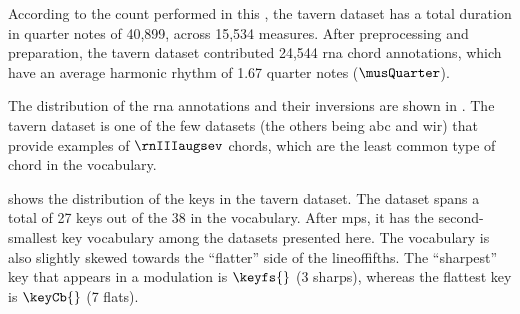 
According to the count performed in this \thesisdiss{}, the
\gls{tavern} dataset has a total duration in quarter notes
of 40,899, across 15,534 measures. After preprocessing and
preparation, the \gls{tavern} dataset contributed 24,544
\gls{rna} chord annotations, which have an average harmonic
rhythm of 1.67 quarter notes ($\musQuarter$).

The distribution of the \gls{rna} annotations and their
inversions are shown in . The
\gls{tavern} dataset is one of the few datasets (the others
being \gls{abc} and \gls{wir}) that provide examples of
$\rnIIIaugsev$ chords, which are the least common type of
chord in the vocabulary.



 shows the distribution of the
keys in the \gls{tavern} dataset. The dataset spans a total
of 27 keys out of the 38 in the vocabulary. After \gls{mps},
it has the second-smallest key vocabulary among the datasets
presented here. The vocabulary is also slightly skewed
towards the ``flatter'' side of the \gls{lineoffifths}. The
``sharpest'' key that appears in a modulation is $\keyfs{}$ (3
sharps), whereas the flattest key is $\keyCb{}$ (7 flats).

